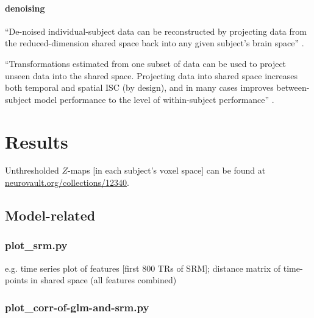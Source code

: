 \paragraph{denoising}
%
``De-noised individual-subject data can be reconstructed by
projecting data from the reduced-dimension shared space back into any given
subject’s brain space'' \citep{kumar2020brainiak}.

%
``Transformations estimated from one subset of data can be used to project
unseen data into the shared space. Projecting data into shared space increases
both temporal and spatial ISC (by design), and in many cases improves
between-subject model performance to the level of within-subject performance''
\citep{kumar2020brainiak}.


\section{Results}

Unthresholded $Z$-maps [in each subject's voxel space] can be found at
\href{https://identifiers.org/neurovault.collection:12340}{\url{neurovault.org/collections/12340}}.




\subsection{Model-related}

\subsubsection{plot\_srm.py}


e.g. time series plot of features [first 800 TRs of SRM]; distance matrix of
time-points in shared space (all features combined)


\subsubsection{plot\_corr-of-glm-and-srm.py}


